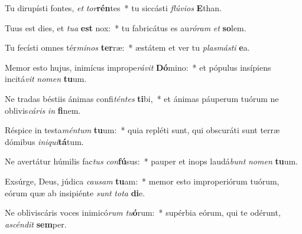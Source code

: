 \item Tu dirupísti fontes, \textit{et} \textit{tor}\textbf{rén}tes~* tu siccásti \textit{flú}\textit{vi}\textit{os} \textbf{E}than.
\item Tuus est dies, et \textit{tu}\textit{a} \textbf{est} nox:~* tu fabricátus es au\textit{ró}\textit{ram} \textit{et} \textbf{so}lem.
\item Tu fecísti omnes tér\textit{mi}\textit{nos} \textbf{ter}ræ:~* æstátem et ver tu \textit{plas}\textit{más}\textit{ti} \textbf{e}a.
\item Memor esto hujus, inimícus imprope\textit{rá}\textit{vit} \textbf{Dó}mino:~* et pópulus insípiens incitá\textit{vit} \textit{no}\textit{men} \textbf{tu}um.
\item Ne tradas béstiis ánimas confi\textit{tén}\textit{tes} \textbf{ti}bi,~* et ánimas páuperum tuórum ne oblivis\textit{cá}\textit{ris} \textit{in} \textbf{fi}nem.
\item Réspice in testa\textit{mén}\textit{tum} \textbf{tu}um:~* quia repléti sunt, qui obscuráti sunt terræ dómibus \textit{in}\textit{i}\textit{qui}\textbf{tá}tum.
\item Ne avertátur húmilis fac\textit{tus} \textit{con}\textbf{fú}sus:~* pauper et inops laudá\textit{bunt} \textit{no}\textit{men} \textbf{tu}um.
\item Exsúrge, Deus, júdica \textit{cau}\textit{sam} \textbf{tu}am:~* memor esto improperiórum tuórum, eórum quæ ab insipiénte \textit{sunt} \textit{to}\textit{ta} \textbf{di}e.
\item Ne obliviscáris voces inimicó\textit{rum} \textit{tu}\textbf{ó}rum:~* supérbia eórum, qui te odérunt, \textit{a}\textit{scén}\textit{dit} \textbf{sem}per.
